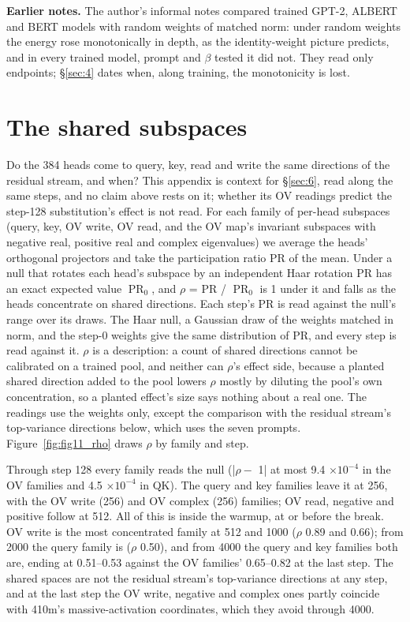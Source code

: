 \documentclass[11pt]{article}
\begin{document}
\textbf{Earlier notes.} The author's informal notes compared trained GPT-2, ALBERT and BERT models with random weights of matched norm: under random weights the energy rose monotonically in depth, as the identity-weight picture predicts, and in every trained model, prompt and $\beta $ tested it did not. They read only endpoints; \S\ref{sec:4} dates when, along training, the monotonicity is lost.

\appendix

\section{The shared subspaces}\label{sec:A}

Do the 384 heads come to query, key, read and write the same directions of the residual stream, and when? This appendix is context for \S\ref{sec:6}, read along the same steps, and no claim above rests on it; whether its OV readings predict the step-128 substitution's effect is not read. For each family of per-head subspaces (query, key, OV write, OV read, and the OV map's invariant subspaces with negative real, positive real and complex eigenvalues) we average the heads' orthogonal projectors and take the participation ratio PR of the mean. Under a null that rotates each head's subspace by an independent Haar rotation PR has an exact expected value $\operatorname{PR}_{0}$, and $\rho $ = PR / $\operatorname{PR}_{0}$ is 1 under it and falls as the heads concentrate on shared directions. Each step's PR is read against the null's range over its draws. The Haar null, a Gaussian draw of the weights matched in norm, and the step-0 weights give the same distribution of PR, and every step is read against it. $\rho $ is a description: a count of shared directions cannot be calibrated on a trained pool, and neither can $\rho $'s effect side, because a planted shared direction added to the pool lowers $\rho $ mostly by diluting the pool's own concentration, so a planted effect's size says nothing about a real one. The readings use the weights only, except the comparison with the residual stream's top-variance directions below, which uses the seven prompts. Figure~\ref{fig:fig11_rho} draws $\rho $ by family and step.

Through step 128 every family reads the null (|$\rho -$ 1| at most 9.4 $\times 10^{-4}$ in the OV families and 4.5 $\times 10^{-4}$ in QK). The query and key families leave it at 256, with the OV write (256) and OV complex (256) families; OV read, negative and positive follow at 512. All of this is inside the warmup, at or before the break. OV write is the most concentrated family at 512 and 1000 ($\rho $ 0.89 and 0.66); from 2000 the query family is ($\rho $ 0.50), and from 4000 the query and key families both are, ending at 0.51--0.53 against the OV families' 0.65--0.82 at the last step. The shared spaces are not the residual stream's top-variance directions at any step, and at the last step the OV write, negative and complex ones partly coincide with 410m's massive-activation coordinates, which they avoid through 4000.
\end{document}

